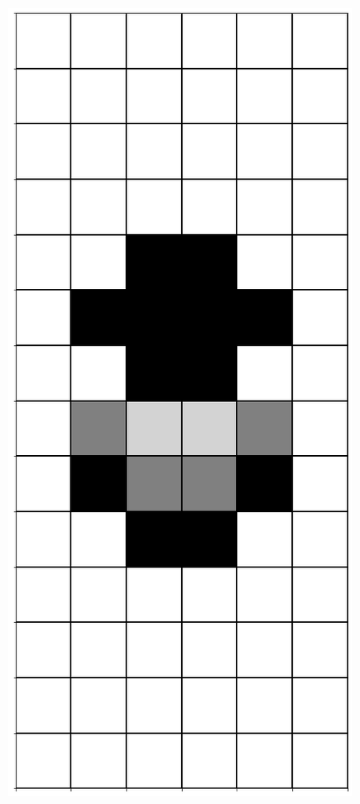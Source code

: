 \documentclass[12pt]{article}
\numberwithin{figure}{section} %
\begin{document}
\begin{figure}[H]
\begin{subfigure}{0.18\textwidth}
     	\subcaption{}
   	\end{subfigure}
    	\begin{subfigure}{0.18\textwidth}
     	\centering
     	\includegraphics[width=\linewidth]{Section4/34.1}

\end{subfigure}
\end{figure}
\end{document}

